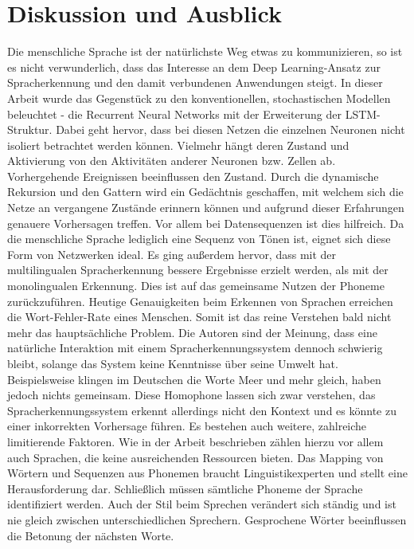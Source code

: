 \section{Diskussion und Ausblick}
Die menschliche Sprache ist der natürlichste Weg etwas zu kommunizieren, so ist es nicht verwunderlich, dass das Interesse an dem Deep Learning-Ansatz zur Spracherkennung und den damit verbundenen Anwendungen steigt. In dieser Arbeit wurde das Gegenstück zu den konventionellen, stochastischen Modellen beleuchtet - die Recurrent Neural Networks mit der Erweiterung der LSTM-Struktur. Dabei geht hervor, dass bei diesen Netzen die einzelnen Neuronen nicht isoliert betrachtet werden können. Vielmehr hängt deren Zustand und Aktivierung von den Aktivitäten anderer Neuronen bzw. Zellen ab. Vorhergehende Ereignissen beeinflussen den Zustand. Durch die dynamische Rekursion und den Gattern wird ein Gedächtnis geschaffen, mit welchem sich die Netze an vergangene Zustände erinnern können und aufgrund dieser Erfahrungen genauere Vorhersagen treffen. Vor allem bei Datensequenzen ist dies hilfreich. Da die menschliche Sprache lediglich eine Sequenz von Tönen ist, eignet sich diese Form von Netzwerken ideal. Es ging außerdem hervor, dass mit der multilingualen Spracherkennung bessere Ergebnisse erzielt werden, als mit der monolingualen Erkennung. Dies ist auf das gemeinsame Nutzen der Phoneme zurückzuführen. Heutige Genauigkeiten beim Erkennen von Sprachen erreichen die Wort-Fehler-Rate eines Menschen. Somit ist das reine Verstehen bald nicht mehr das hauptsächliche Problem. Die Autoren sind der Meinung, dass eine natürliche Interaktion mit einem Spracherkennungssystem dennoch schwierig bleibt, solange das System keine Kenntnisse über seine Umwelt hat. Beispielsweise klingen im Deutschen die Worte Meer und mehr gleich, haben jedoch nichts gemeinsam. Diese Homophone lassen sich zwar verstehen, das Spracherkennungssystem erkennt allerdings nicht den Kontext und es könnte zu einer inkorrekten Vorhersage führen. Es bestehen auch weitere, zahlreiche limitierende Faktoren. Wie in der Arbeit beschrieben zählen hierzu vor allem auch Sprachen, die keine ausreichenden Ressourcen bieten. Das Mapping von Wörtern und Sequenzen aus Phonemen braucht Linguistikexperten und stellt eine Herausforderung dar. Schließlich müssen sämtliche Phoneme der Sprache identifiziert werden. Auch der Stil beim Sprechen verändert sich ständig und ist nie gleich zwischen unterschiedlichen Sprechern. Gesprochene Wörter beeinflussen die Betonung der nächsten Worte.
\\\\
